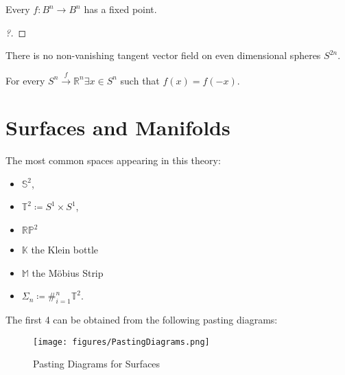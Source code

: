 \begin{theorem}[?]

Every \(f: B^n \to B^n\) has a fixed point.

\end{theorem}

\begin{proof}[?]

\end{proof}


\begin{theorem}

There is no non-vanishing tangent vector field on even dimensional
spheres \(S^{2n}\).

\end{theorem}

\begin{theorem}

For every \(S^n \xrightarrow{f} {\mathbb{R}}^n \exists x\in S^n\) such
that \(f(x) = f(-x)\).

\end{theorem}

\hypertarget{surfaces-and-manifolds}{%
\section{Surfaces and Manifolds}\label{surfaces-and-manifolds}}

\begin{remark}

The most common spaces appearing in this theory:

\begin{itemize}
\tightlist
\item
  \({\mathbb{S}}^2\),
\item
  \({\mathbb{T}}^2 \coloneqq S^1\times S^1\),
\item
  \({\mathbb{RP}}^2\)
\item
  \({\mathbb{K}}\) the Klein bottle
\item
  \({\mathbb{M}}\) the Möbius Strip
\item
  \(\Sigma_n \coloneqq\#_{i=1}^n {\mathbb{T}}^2\).
\end{itemize}

The first 4 can be obtained from the following pasting diagrams:

\begin{figure}
\centering
\texttt{[image: figures/PastingDiagrams.png]}
\caption{Pasting Diagrams for Surfaces}
\end{figure}

\end{remark}

